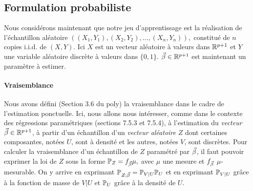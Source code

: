 \documentclass[french,11pt]{article}
\begin{document}
\subsection{Formulation probabiliste}  
Nous considérons maintenant que notre jeu d'apprentissage est la réalisation de
l'échantillon aléatoire
$\left((X_1, Y_1), (X_2, Y_2), \dots, (X_n, Y_n) \right), $ constitué de $n$
copies i.i.d. de $(X, Y)$. Ici $X$ est un vecteur aléatoire à valeurs dans
$\mathbb{R}^{p+1}$ et $Y$ une variable aléatoire discrète à valeurs dans $\{0,
1\}$. $\bbeta \in \RR^{p+1}$ est maintenant un paramètre à
estimer.


\paragraph{Vraisemblance} Nous avons défini (Section 3.6 du poly) la
vraisemblance dans le cadre de l'estimation ponctuelle. Ici, nous allons nous
intéresser, comme dans le contexte des régressions paramétriques (sections
7.5.3 et 7.5.4), à l'estimation du \textit{vecteur} $\bbeta \in \RR^{p+1}$, à
partir d'un échantillon d'un \textit{vecteur aléatoire} $Z$ dont certaines
composantes, notées $U$, sont à densité et les autres, notées $V$, sont
discrètes. Pour calculer la vraisemblance d'un échantillon de $Z$ paramétré par
$\bbeta$, il faut pouvoir exprimer la loi de $Z$ sous la forme
$\PP_Z = f_{\bbeta} \mu,$ avec $\mu$ une mesure et $f_{\bbeta}$
$\mu$-mesurable. On y arrive en exprimant $\PP_{Z;\bbeta} = \PP_{V|U} \PP_U$ et
en exprimant $\mathbb{P}_{V|U}$ grâce à la fonction de masse de $V|U$ et $\mathbb{P}_U$ grâce
à la densité de $U$.
\end{document}
